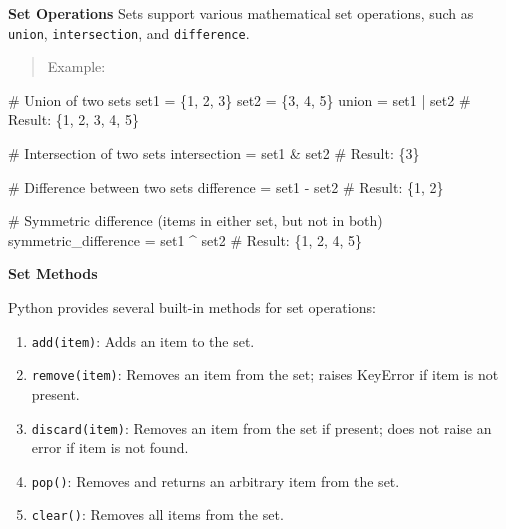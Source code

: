 \documentclass[
  letterpaper,
  DIV=11,
  numbers=noendperiod]{scrreprt}
\newenvironment{Shaded}{\begin{snugshade}}{\end{snugshade}}
\newcommand{\CommentTok}[1]{\textcolor[rgb]{0.37,0.37,0.37}{#1}}
\newcommand{\DecValTok}[1]{\textcolor[rgb]{0.68,0.00,0.00}{#1}}
\newcommand{\NormalTok}[1]{\textcolor[rgb]{0.00,0.23,0.31}{#1}}
\newcommand{\OperatorTok}[1]{\textcolor[rgb]{0.37,0.37,0.37}{#1}}
\providecommand{\tightlist}{%
  \setlength{\itemsep}{0pt}\setlength{\parskip}{0pt}}\usepackage{longtable,booktabs,array}
\theoremstyle{plain}
\theoremstyle{definition}
\theoremstyle{remark}
\begin{document}
\textbf{Set Operations} Sets support various mathematical set
operations, such as \texttt{union}, \texttt{intersection}, and
\texttt{difference}.

\begin{quote}
Example:
\end{quote}

\begin{Shaded}
\begin{Highlighting}[]
\CommentTok{\# Union of two sets}
\NormalTok{set1 }\OperatorTok{=}\NormalTok{ \{}\DecValTok{1}\NormalTok{, }\DecValTok{2}\NormalTok{, }\DecValTok{3}\NormalTok{\}}
\NormalTok{set2 }\OperatorTok{=}\NormalTok{ \{}\DecValTok{3}\NormalTok{, }\DecValTok{4}\NormalTok{, }\DecValTok{5}\NormalTok{\}}
\NormalTok{union }\OperatorTok{=}\NormalTok{ set1 }\OperatorTok{|}\NormalTok{ set2  }\CommentTok{\# Result: \{1, 2, 3, 4, 5\}}

\CommentTok{\# Intersection of two sets}
\NormalTok{intersection }\OperatorTok{=}\NormalTok{ set1 }\OperatorTok{\&}\NormalTok{ set2  }\CommentTok{\# Result: \{3\}}

\CommentTok{\# Difference between two sets}
\NormalTok{difference }\OperatorTok{=}\NormalTok{ set1 }\OperatorTok{{-}}\NormalTok{ set2  }\CommentTok{\# Result: \{1, 2\}}

\CommentTok{\# Symmetric difference (items in either set, but not in both)}
\NormalTok{symmetric\_difference }\OperatorTok{=}\NormalTok{ set1 }\OperatorTok{\^{}}\NormalTok{ set2  }\CommentTok{\# Result: \{1, 2, 4, 5\}}
\end{Highlighting}
\end{Shaded}

\textbf{Set Methods}

Python provides several built-in methods for set operations:

\begin{enumerate}
\def\labelenumi{\arabic{enumi}.}
\tightlist
\item
  \texttt{add(item)}: Adds an item to the set.
\item
  \texttt{remove(item)}: Removes an item from the set; raises KeyError
  if item is not present.
\item
  \texttt{discard(item)}: Removes an item from the set if present; does
  not raise an error if item is not found.
\item
  \texttt{pop()}: Removes and returns an arbitrary item from the set.
\item
  \texttt{clear()}: Removes all items from the set.
\end{enumerate}
\end{document}

